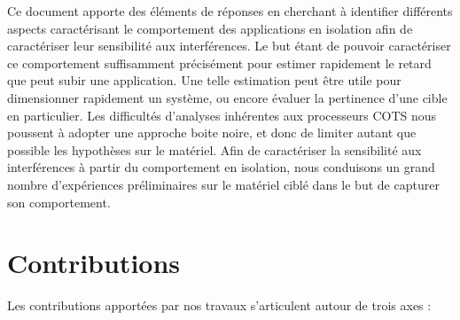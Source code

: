 Ce document apporte des éléments de réponses en cherchant à identifier différents aspects caractérisant le comportement des applications en isolation afin de caractériser leur sensibilité aux interférences.
Le but étant de pouvoir caractériser ce comportement suffisamment précisément pour estimer rapidement le retard que peut subir une application.
Une telle estimation peut être utile pour dimensionner rapidement un système, ou encore évaluer la pertinence d'une cible en particulier.
Les difficultés d'analyses inhérentes aux processeurs COTS nous poussent à adopter une approche boite noire, et donc de limiter autant que possible les hypothèses sur le matériel.
Afin de caractériser la sensibilité aux interférences à partir du comportement en isolation, nous conduisons un grand nombre d'expériences préliminaires sur le matériel ciblé dans le but de capturer son comportement.

\section{Contributions}

Les contributions apportées par nos travaux s'articulent autour de trois axes : 

